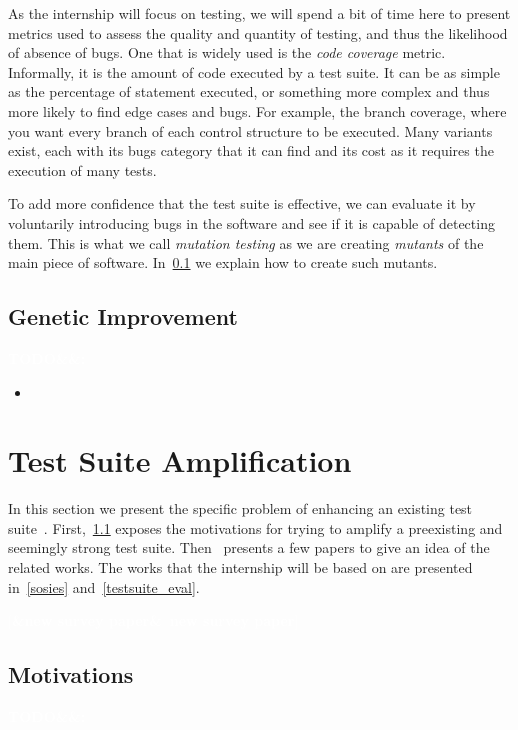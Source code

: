 \documentclass[11pt]{sdm}
\newcommand{\addref}[1]{\colorbox{TealBlue!100}{\textcolor{white}{\textbf{$[$\ifx&#1&\ \else#1\fi$]$}}}}
\newcommand{\todo}[1]{\colorbox{Red!75}{\textcolor{white}{\textbf{TODO\ifx&#1&\else: #1\fi}}}}
\begin{document}
As the internship will focus on testing, we will spend a bit of time here to present metrics used to assess the quality and quantity of testing, and thus the likelihood of absence of bugs.
One that is widely used is the \textit{code coverage} metric.
Informally, it is the amount of code executed by a test suite.
It can be as simple as the percentage of statement executed, or something more complex and thus more likely to find edge cases and bugs.
For example, the branch coverage, where you want every branch of each control structure to be executed.
Many variants exist, each with its bugs category that it can find and its cost as it requires the execution of many tests.

To add more confidence that the test suite is effective, we can evaluate it by voluntarily introducing bugs in the software and see if it is capable of detecting them.
This is what we call \textit{mutation testing} as we are creating \textit{mutants} of the main piece of software.
In~\ref{applications} we explain how to create such mutants.

\subsection{Genetic Improvement}
\label{applications}
\todo{}

\begin{itemize}
  \item
\end{itemize}

\cite{petke2017genetic}



\section{Test Suite Amplification}
\label{tsa}
In this section we present the specific problem of enhancing an existing test suite~\cite{danglot2017emerging}.
First,~\ref{motiv_tsa} exposes the motivations for trying to amplify a preexisting and seemingly strong test suite.
Then~ presents a few papers to give an idea of the related works.
The works that the internship will be based on are presented in~\ref{sosies} and~\ref{testsuite_eval}.

\addref{new survey paper}

\subsection{Motivations}
\label{motiv_tsa}
\todo{}
\end{document}
